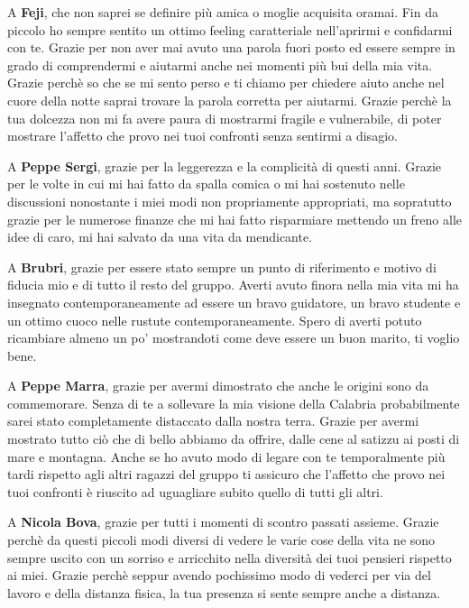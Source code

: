\documentclass[cucitura%
,12pt%
]{toptesi}
\begin{document}
A \textbf{Feji}, che non saprei se definire più amica o moglie acquisita oramai. Fin da piccolo ho sempre sentito un ottimo feeling caratteriale nell'aprirmi e confidarmi con te. Grazie per non aver mai avuto una parola
fuori posto ed essere sempre in grado di comprendermi e aiutarmi anche nei momenti più bui della mia vita. Grazie perchè so che se mi sento perso e ti chiamo per chiedere aiuto anche nel cuore della notte saprai trovare la parola
corretta per aiutarmi. Grazie perchè la tua dolcezza non mi fa avere paura di mostrarmi fragile e vulnerabile, di poter mostrare l'affetto che provo nei tuoi confronti senza sentirmi a disagio.

A \textbf{Peppe Sergi}, grazie per la leggerezza e la complicità di questi anni. Grazie per le volte in cui mi hai fatto da spalla comica o mi hai sostenuto nelle discussioni nonostante i miei modi non propriamente appropriati,
ma sopratutto grazie per le numerose finanze che mi hai fatto risparmiare mettendo un freno alle idee di caro, mi hai salvato da una vita da mendicante.

A \textbf{Brubri}, grazie per essere stato sempre un punto di riferimento e motivo di fiducia mio e di tutto il resto del gruppo. Averti avuto finora nella mia vita mi ha insegnato contemporaneamente ad essere un bravo guidatore,
un bravo studente e un ottimo cuoco nelle rustute contemporaneamente. Spero di averti potuto ricambiare almeno un po’ mostrandoti come deve essere un buon marito, ti voglio bene.

A \textbf{Peppe Marra}, grazie per avermi dimostrato che anche le origini sono da commemorare. Senza di te a sollevare la mia visione della Calabria probabilmente sarei stato completamente distaccato dalla nostra terra. Grazie per
avermi mostrato tutto ciò che di bello abbiamo da offrire, dalle cene al satizzu ai posti di mare e montagna. Anche se ho avuto modo di legare con te temporalmente più tardi rispetto agli altri ragazzi del gruppo ti assicuro che l'affetto
che provo nei tuoi confronti è riuscito ad uguagliare subito quello di tutti gli altri.

A \textbf{Nicola Bova}, grazie per tutti i momenti di scontro passati assieme. Grazie perchè da questi piccoli modi diversi di vedere le varie cose della vita ne sono sempre uscito con un sorriso e arricchito nella diversità dei tuoi pensieri rispetto ai miei.
Grazie perchè seppur avendo pochissimo modo di vederci per via del lavoro e della distanza fisica, la tua presenza si sente sempre anche a distanza.
\end{document}
